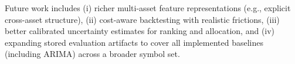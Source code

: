 \documentclass{svproc}
\begin{document}
Future work includes (i) richer multi-asset feature representations (e.g., explicit cross-asset structure), (ii) cost-aware backtesting with realistic frictions, (iii) better calibrated uncertainty estimates for ranking and allocation, and (iv) expanding stored evaluation artifacts to cover all implemented baselines (including ARIMA) across a broader symbol set.



\end{document}
